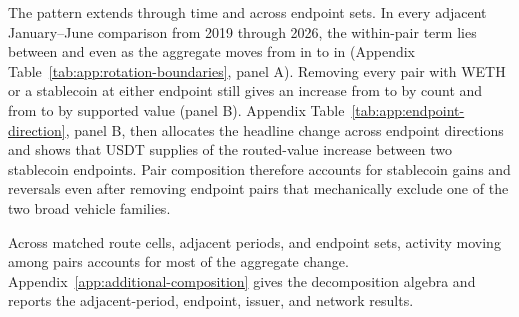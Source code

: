 The pattern extends through time and across endpoint sets. In every adjacent January--June comparison from 2019 through 2026, the within-pair term lies between \AdjacentWithinMin{} and \AdjacentWithinMax{} even as the aggregate moves from \AdjacentLargestDecline{} in \AdjacentLargestDeclineYears{} to \AdjacentLargestIncrease{} in \AdjacentLargestIncreaseYears{} (Appendix Table~\ref{tab:app:rotation-boundaries}, panel A). Removing every pair with WETH or a stablecoin at either endpoint still gives an increase from \NonvehicleEndpointStableBase{} to \NonvehicleEndpointStableEnd{} by count and from \NonvehicleEndpointValueBase{} to \NonvehicleEndpointValueEnd{} by supported value (panel B). Appendix Table~\ref{tab:app:endpoint-direction}, panel B, then allocates the headline change across endpoint directions and shows that USDT supplies \StableStableUsdtValueContribution{} of the routed-value increase between two stablecoin endpoints. Pair composition therefore accounts for stablecoin gains and reversals even after removing endpoint pairs that mechanically exclude one of the two broad vehicle families.

Across matched route cells, adjacent periods, and endpoint sets, activity moving among pairs accounts for most of the aggregate change. Appendix~\ref{app:additional-composition} gives the decomposition algebra and reports the adjacent-period, endpoint, issuer, and network results.
